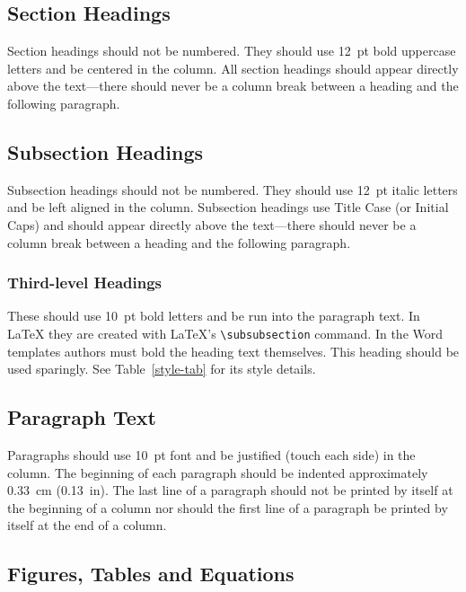 \documentclass[letterpaper,  %
              ]{jacow-2_3}   %
\begin{document}
{{\subsection{Section Headings}

Section headings should not be numbered. They should
use  \SI{12}{pt}  bold  uppercase  letters  and  be  centered  in  the
column. All section headings should appear directly above
the text---there should never be a column break between a heading and the
following paragraph.

\subsection{Subsection Headings}

Subsection  headings  should  not  be  numbered.
They should use \SI{12}{pt} italic letters and be left aligned in the column.
Subsection headings use Title Case (or Initial Caps)
and should appear directly above the text---there should never be a column break
between a heading and the following paragraph.

\subsubsection{Third-level Headings} These should use \SI{10}{pt} bold
letters and be run into the paragraph text. In \LaTeX{} they are
created with \LaTeX's \verb|\subsubsection| command.
In the Word templates authors must bold the heading text themselves.
This heading should be used sparingly. See Table~\ref{style-tab}
for its style details.

\subsection{Paragraph Text}

Paragraphs should use \SI{10}{pt} font and be justified (touch each side) in
the column. The beginning of each paragraph should be indented
approximately \SI{0.33}{cm} (\SI{0.13}{in}). The last line of a paragraph should not be
printed by itself at the beginning of a column nor should the first line of
a paragraph be printed by itself at the end of a column.

\subsection{Figures, Tables and Equations}

}}
\end{document}
